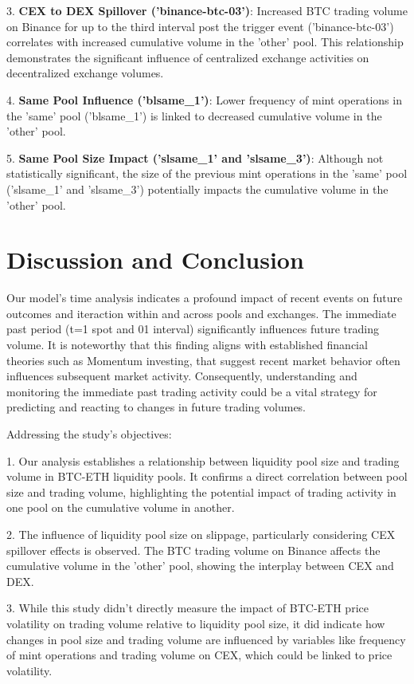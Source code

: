 \documentclass{article}
\begin{document}
3. \textbf{CEX to DEX Spillover ('binance-btc-03')}: Increased BTC trading volume on Binance for up to the third interval post the trigger event ('binance-btc-03') correlates with increased cumulative volume in the 'other' pool. This relationship demonstrates the significant influence of centralized exchange activities on decentralized exchange volumes.

4. \textbf{Same Pool Influence ('blsame\_1')}: Lower frequency of mint operations in the 'same' pool ('blsame\_1') is linked to decreased cumulative volume in the 'other' pool.

5. \textbf{Same Pool Size Impact ('slsame\_1' and 'slsame\_3')}: Although not statistically significant, the size of the previous mint operations in the 'same' pool ('slsame\_1' and 'slsame\_3') potentially impacts the cumulative volume in the 'other' pool.

\section{\textbf{Discussion and Conclusion}}

Our model's time analysis indicates a profound impact of recent events on future outcomes and iteraction within and across pools and exchanges. The immediate past period (t=1 spot and 01 interval) significantly influences future trading volume. It is noteworthy that this finding aligns with established financial theories such as Momentum investing, that suggest recent market behavior often influences subsequent market activity. Consequently, understanding and monitoring the immediate past trading activity could be a vital strategy for predicting and reacting to changes in future trading volumes.

Addressing the study's objectives:

1. Our analysis establishes a relationship between liquidity pool size and trading volume in BTC-ETH liquidity pools. It confirms a direct correlation between pool size and trading volume, highlighting the potential impact of trading activity in one pool on the cumulative volume in another.

2. The influence of liquidity pool size on slippage, particularly considering CEX spillover effects is observed. The BTC trading volume on Binance affects the cumulative volume in the 'other' pool, showing the interplay between CEX and DEX.

3. While this study didn't directly measure the impact of BTC-ETH price volatility on trading volume relative to liquidity pool size, it did indicate how changes in pool size and trading volume are influenced by variables like frequency of mint operations and trading volume on CEX, which could be linked to price volatility.
\end{document}
